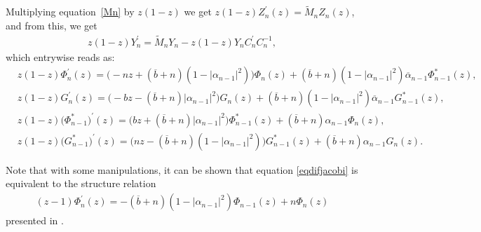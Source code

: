\documentclass[12pt]{amsart}
\newtheorem{theorem}{Theorem}[section]
\newtheorem{corollary}{Corollary}[section]
\begin{document}
Multiplying equation~\eqref{Mn} by \( z (1-z) \) we get \( z (1-z) Z_n^\prime (z) = \widetilde M_n Z_n (z) \), and from this, we get
\begin{align*}%
 z(1-z)Y_n^{\prime}=\widetilde{M}_nY_n-z(1-z)Y_nC_n^{\prime}C_n^{-1} ,
\end{align*}
which entrywise reads as:
{\small
\begin{align}
 & 
z(1-z)\Phi_n^{\prime}(z)
 =
 \big( -nz+(\overline{b}+n)(1-|\alpha_{n-1}|^2) \big)
 \Phi_n(z)+(\overline{b}+n)(1-|\alpha_{n-1}|^2)\overline{\alpha}_{n-1}\Phi_{n-1}^*(z)
 \label{eqdifjacobi}, 
 \\
\nonumber & z(1-z)G_n^{\prime}(z)
 =
 \big( 
 -bz-(\overline{b}+n)|\alpha_{n-1}|^2
 \big)
 G_n(z)+(\overline{b}+n)(1-|\alpha_{n-1}|^2)\overline{\alpha}_{n-1}G_{n-1}^*(z),
 \\
 \nonumber & z(1-z) \big( \Phi_{n-1}^* \big)^{\prime}(z)
 =
\big(
bz+(\overline{b}+n)|\alpha_{n-1}|^2
\big)
\Phi_{n-1}^*(z)+(\overline{b}+n)\alpha_{n-1}\Phi_{n}(z), 
 \\
\nonumber & z(1-z) \big( G_{n-1}^* \big)^{\prime}(z)
 =
\big(
nz-(\overline{b}+n)(1-|\alpha_{n-1}|^2)
\big)
G_{n-1}^*(z)+(\overline{b}+n)\alpha_{n-1}G_{n}(z).
\end{align}
}


Note that with some manipulations, it can be shown that equation \eqref{eqdifjacobi} is equivalent to the structure relation
\begin{align*}
(z-1)\Phi_{n}^{\prime}(z)=-(\overline{b}+n)(1-|\alpha_{n-1}|^2)\Phi_{n-1}(z)+n\Phi_{n}(z)
\end{align*}
presented in \cite{BRS23}.


\end{document}
